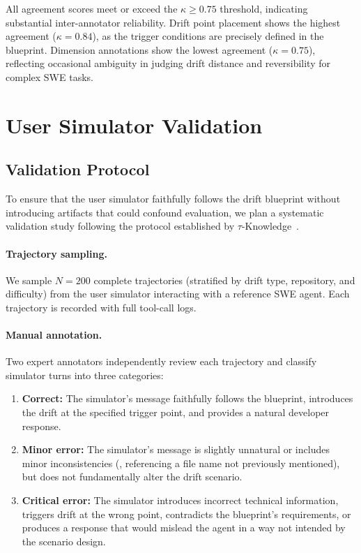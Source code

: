 \noindent All agreement scores meet or exceed the $\kappa \geq 0.75$ threshold, indicating substantial inter-annotator reliability. Drift point placement shows the highest agreement ($\kappa = 0.84$), as the trigger conditions are precisely defined in the blueprint. Dimension annotations show the lowest agreement ($\kappa = 0.75$), reflecting occasional ambiguity in judging drift distance and reversibility for complex SWE tasks.


\section{User Simulator Validation}
\label{app:user-simulator}

\subsection{Validation Protocol}

To ensure that the user simulator faithfully follows the drift blueprint without introducing artifacts that could confound evaluation, we plan a systematic validation study following the protocol established by $\tau$-Knowledge~\citep{tauknowledge2026}.

\paragraph{Trajectory sampling.}
We sample $N = 200$ complete trajectories (stratified by drift type, repository, and difficulty) from the user simulator interacting with a reference SWE agent. Each trajectory is recorded with full tool-call logs.

\paragraph{Manual annotation.}
Two expert annotators independently review each trajectory and classify simulator turns into three categories:

\begin{enumerate}[leftmargin=*, itemsep=2pt]
    \item \textbf{Correct:} The simulator's message faithfully follows the blueprint, introduces the drift at the specified trigger point, and provides a natural developer response.
    \item \textbf{Minor error:} The simulator's message is slightly unnatural or includes minor inconsistencies (\eg, referencing a file name not previously mentioned), but does not fundamentally alter the drift scenario.
    \item \textbf{Critical error:} The simulator introduces incorrect technical information, triggers drift at the wrong point, contradicts the blueprint's requirements, or produces a response that would mislead the agent in a way not intended by the scenario design.
\end{enumerate}

